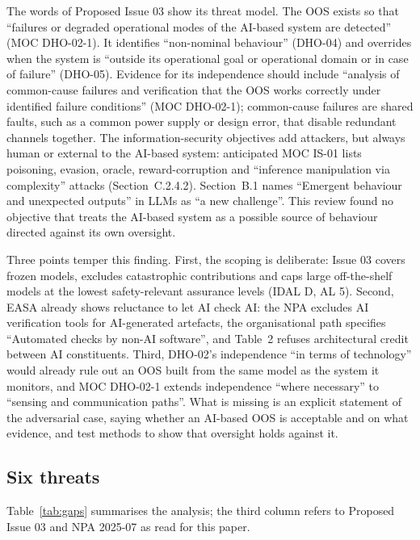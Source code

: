\documentclass[11pt]{article}
\begin{document}
The words of Proposed Issue 03 show its threat model. The OOS exists so that ``failures or degraded operational modes of the AI-based system are detected'' (MOC DHO-02-1). It identifies ``non-nominal behaviour'' (DHO-04) and overrides when the system is ``outside its operational goal or operational domain or in case of failure'' (DHO-05). Evidence for its independence should include ``analysis of common-cause failures and verification that the OOS works correctly under identified failure conditions'' (MOC DHO-02-1); common-cause failures are shared faults, such as a common power supply or design error, that disable redundant channels together. The information-security objectives add attackers, but always human or external to the AI-based system: anticipated MOC IS-01 lists poisoning, evasion, oracle, reward-corruption and ``inference manipulation via complexity'' attacks (Section~C.2.4.2). Section~B.1 names ``Emergent behaviour and unexpected outputs'' in LLMs as ``a new challenge''. This review found no objective that treats the AI-based system as a possible source of behaviour directed against its own oversight.

Three points temper this finding. First, the scoping is deliberate: Issue 03 covers frozen models, excludes catastrophic contributions and caps large off-the-shelf models at the lowest safety-relevant assurance levels (IDAL D, AL 5). Second, EASA already shows reluctance to let AI check AI: the NPA excludes AI verification tools for AI-generated artefacts, the organisational path specifies ``Automated checks by non-AI software'', and Table~2 refuses architectural credit between AI constituents. Third, DHO-02's independence ``in terms of technology'' would already rule out an OOS built from the same model as the system it monitors, and MOC DHO-02-1 extends independence ``where necessary'' to ``sensing and communication paths''. What is missing is an explicit statement of the adversarial case, saying whether an AI-based OOS is acceptable and on what evidence, and test methods to show that oversight holds against it.

\subsection{Six threats}\label{sec:threats}

Table~\ref{tab:gaps} summarises the analysis; the third column refers to Proposed Issue 03 and NPA 2025-07 as read for this paper.
\end{document}
